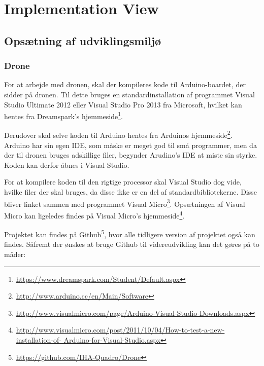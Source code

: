 \documentclass[Main]{subfiles}
\begin{document}
\section{Implementation View}


\subsection{Opsætning af udviklingsmiljø}

\subsubsection{Drone}
For at arbejde med dronen, skal der kompileres kode til Arduino-boardet, der sidder på dronen.
Til dette bruges en standardinstallation af programmet Visual Studio Ultimate 2012 eller Visual Studio Pro 2013 fra Microsoft, hvilket kan hentes fra Dreamspark's hjemmeside\footnote{\url{https://www.dreamspark.com/Student/Default.aspx}}.

Derudover skal selve koden til Arduino hentes fra Arduinos hjemmeside\footnote{\url{http://www.arduino.cc/en/Main/Software}}.
Arduino har sin egen IDE, som måske er meget god til små programmer, men da der til dronen bruges adskillige filer, begynder Arudino's IDE at miste sin styrke.
Koden kan derfor åbnes i Visual Studio.

For at kompilere koden til den rigtige processor skal Visual Studio dog vide, hvilke filer der skal bruges, da disse ikke er en del af standardbibliotekerne.
Disse bliver linket sammen med programmet Visual Micro\footnote{\url{http://www.visualmicro.com/page/Arduino-Visual-Studio-Downloads.aspx}}.
Opsætningen af Visual Micro kan ligeledes findes på Visual Micro's hjemmeside\footnote{\url{http://www.visualmicro.com/post/2011/10/04/How-to-test-a-new-installation-of- Arduino-for-Visual-Studio.aspx}}.

Projektet kan findes på Github\footnote{\url{https://github.com/IHA-Quadro/Drone}}, hvor alle tidligere version af projektet også kan findes.
Såfremt der ønskes at bruge Github til videreudvikling kan det gøres på to måder:
\end{document}
